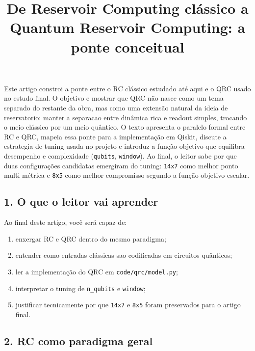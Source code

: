 \documentclass[12pt]{article}
\title{De Reservoir Computing clássico a Quantum Reservoir Computing: a ponte conceitual}
\author{}
\providecommand{\tightlist}{%
          \setlength{\itemsep}{0pt}\setlength{\parskip}{0pt}}
\begin{document}
        \maketitle

        \begin{resumo}
        Este artigo constroi a ponte entre o RC clássico estudado até aqui e o QRC usado no estudo final. O objetivo e mostrar que QRC não nasce como um tema separado do restante da obra, mas como uma extensão natural da ideia de reservatorio: manter a separacao entre dinâmica rica e readout simples, trocando o meio clássico por um meio quântico. O texto apresenta o paralelo formal entre RC e QRC, mapeia essa ponte para a implementação em Qiskit, discute a estrategia de tuning usada no projeto e introduz a função objetivo que equilibra desempenho e complexidade (\texttt{qubits}, \texttt{window}). Ao final, o leitor sabe por que duas configurações candidatas emergiram do tuning: \texttt{14x7} como melhor ponto multi-métrica e \texttt{8x5} como melhor compromisso segundo a função objetivo escalar.
        \end{resumo}

        \subsection{1. O que o leitor vai aprender}\label{1-o-que-o-leitor-vai-aprender}

Ao final deste artigo, você será capaz de:

\begin{enumerate}
\def\labelenumi{\arabic{enumi}.}
\tightlist
\item
  enxergar RC e QRC dentro do mesmo paradigma;
\item
  entender como entradas clássicas sao codificadas em circuitos quânticos;
\item
  ler a implementação do QRC em \texttt{code/qrc/model.py};
\item
  interpretar o tuning de \texttt{n\_qubits} e \texttt{window};
\item
  justificar tecnicamente por que \texttt{14x7} e \texttt{8x5} foram preservados para o artigo final.
\end{enumerate}

\subsection{2. RC como paradigma geral}\label{2-rc-como-paradigma-geral}
\end{document}
